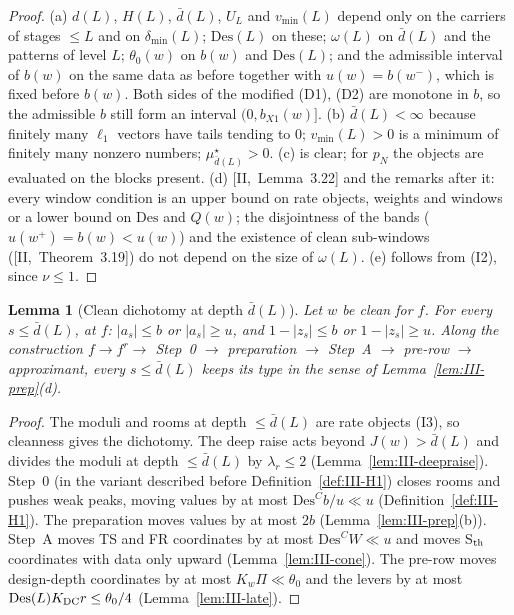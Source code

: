 \documentclass[10pt]{amsart}
\newtheorem{lemma}[theorem]{Lemma}
\theoremstyle{definition}
\theoremstyle{remark}
\begin{document}
\begin{proof}
(a) $d(L)$, $H(L)$, $\bar d(L)$, $U_L$ and $v_{\min}(L)$ depend only on the
carriers of stages $\le L$ and on $\delta_{\min}(L)$; $\mathrm{Des}(L)$ on these;
$\omega(L)$ on $\bar d(L)$ and the patterns of level $L$; $\theta_0(w)$ on $b(w)$
and $\mathrm{Des}(L)$; and the admissible interval of $b(w)$ on the same data as
before together with $u(w)=b(w^-)$, which is fixed before $b(w)$.  Both sides of
the modified (D1), (D2) are monotone in $b$, so the admissible $b$ still form an
interval $(0,b_{X1}(w)]$.  (b) $\bar d(L)<\infty$ because finitely many $\ell_1$
vectors have tails tending to $0$; $v_{\min}(L)>0$ is a minimum of finitely many
nonzero numbers; $\mu^\star_{\bar d(L)}>0$.  (c) is clear; for $p_N$ the objects are
evaluated on the blocks present.  (d) [II,~Lemma~3.22] and the remarks after it:
every window condition is an upper bound on rate objects, weights and windows or a
lower bound on $\mathrm{Des}$ and $Q(w)$; the disjointness of the bands
($u(w^+)=b(w)<u(w)$) and the existence of clean sub-windows
([II,~Theorem~3.19]) do not depend on the size of $\omega(L)$.  (e) follows from
(I2), since $\nu\le1$.
\end{proof}

\begin{lemma}[Clean dichotomy at depth $\bar d(L)$]\label{lem:III-depthclean}
Let $w$ be clean for $f$.  For every $s\le\bar d(L)$, at $f$: $|a_s|\le b$ or
$|a_s|\ge u$, and $1-|z_s|\le b$ or $1-|z_s|\ge u$.  Along the construction
$f\to f^r\to$ Step~0 $\to$ preparation $\to$ Step~A $\to$ pre-row $\to$
approximant, every $s\le\bar d(L)$ keeps its type in the sense of
Lemma~\textup{\ref{lem:III-prep}(d)}.
\end{lemma}

\begin{proof}
The moduli and rooms at depth $\le\bar d(L)$ are rate objects (I3), so
cleanness gives the dichotomy.  The deep raise acts beyond $J(w)>\bar d(L)$ and
divides the moduli at depth $\le\bar d(L)$ by $\lambda_r\le2$
(Lemma~\ref{lem:III-deepraise}).  Step~0 (in the variant described before
Definition~\ref{def:III-H1}) closes rooms and pushes weak peaks,
moving values by at most $\mathrm{Des}^Cb/u\ll u$ (Definition~\ref{def:III-H1}).
The preparation moves values by at most $2b$ (Lemma~\ref{lem:III-prep}(b)).  Step~A moves TS and FR
coordinates by at most $\mathrm{Des}^CW\ll u$ and moves S$_{\rm th}$ coordinates
with data only upward (Lemma~\ref{lem:III-cone}).  The pre-row moves
design-depth coordinates by at most $K_w\Pi\ll\theta_0$ and the levers by at most
$\mathrm{Des}(L)K_{\rm DC}r\le\theta_0/4$ (Lemma~\ref{lem:III-late}).
\end{proof}
\end{document}
